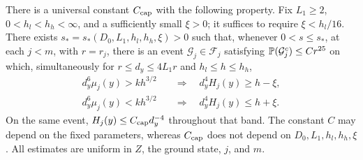 \begin{proposition}
\label{a:prop:cond-comparison}
There is a universal constant $C_{\rm cap}$ with the following
property. Fix $L_1\ge2$, $0<h_l<h_h<\infty$, and a sufficiently
small $\xi>0$; it suffices to require $\xi<h_l/16$.
There exists
$s_*=s_*(D_0,L_1,h_l,h_h,\xi)>0$ such that, whenever
$0<s\le s_*$, at each $j<m$, with $r=r_j$, there is an event
$\mathcal G_j\in\mathcal F_j$ satisfying
$\mathbb P(\mathcal G_j^c)\le Cr^{25}$ on which, simultaneously for
$r\le d_y\le4L_1r$ and $h_l\le h\le h_h$,
\begin{equation}\label{a:eq:cond-inverse}
 \begin{aligned}
 d_y^6\mu_j(y)>kh^{3/2}
       &\quad\Longrightarrow\quad d_y^4H_j(y)\ge h-\xi,\\
 d_y^6\mu_j(y)<kh^{3/2}
       &\quad\Longrightarrow\quad d_y^4H_j(y)\le h+\xi.
 \end{aligned}
\end{equation}
On the same event, $H_j(y)\le C_{\rm cap}d_y^{-4}$ throughout
that band. The constant $C$ may depend on the fixed parameters,
whereas $C_{\rm cap}$ does not depend on $D_0,L_1,h_l,h_h,\xi$.
All estimates are uniform in $Z$, the ground state, $j$, and $m$.
\end{proposition}

